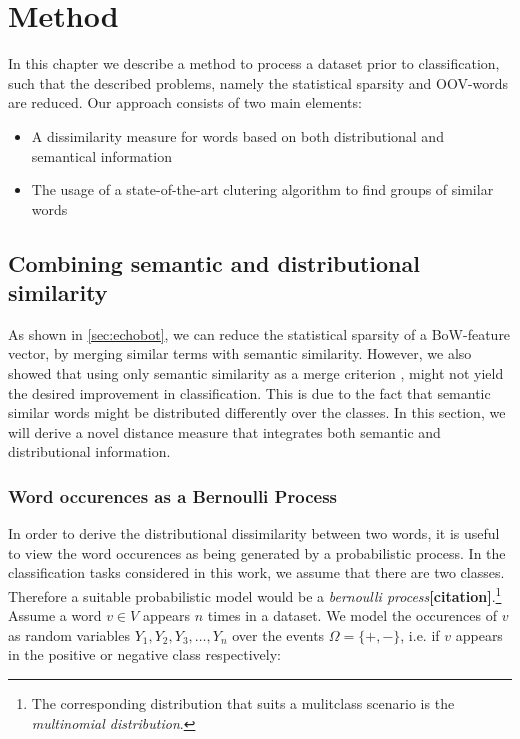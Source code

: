 \chapter{Method}

In this chapter we describe a method to process a dataset prior to
classification, such that the described problems, namely the statistical
sparsity and OOV-words are reduced. Our approach consists of two main
elements:

\begin{itemize}  
  \item A dissimilarity measure for words based on both distributional and
  semantical information
  \item The usage of a state-of-the-art clutering algorithm to find groups of
  similar words

\end{itemize}


\section{Combining semantic and distributional similarity}

As shown in \ref{sec:echobot}, we can reduce the statistical sparsity of a
BoW-feature vector, by merging similar terms with semantic similarity. However,
we also showed that using only semantic similarity as a merge criterion ,
might not yield the desired improvement in classification. This is due to the
fact that semantic similar words might be distributed differently over the
classes. In this section, we will derive a novel distance measure that
integrates both semantic and distributional information. 

\subsection{Word occurences as a Bernoulli Process}
In order to derive the distributional dissimilarity between two words, it is
useful to view the word occurences as being generated by a probabilistic
process. In the classification tasks considered in this work, we assume that
there are two classes. Therefore a suitable probabilistic model would be a
\emph{bernoulli process}\textbf{[citation]}.\footnote{The 
corresponding distribution that suits a mulitclass scenario is the \emph{multinomial
distribution}.} Assume a word $v \in V$ appears $n$ times in a dataset.
We model the occurences of $v$ as random variables $Y_1, Y_2, Y_3, \ldots, Y_n$ over the
events $\Omega = \{ +, -\}$, i.e. if $v$ appears in the positive or negative
class respectively:

